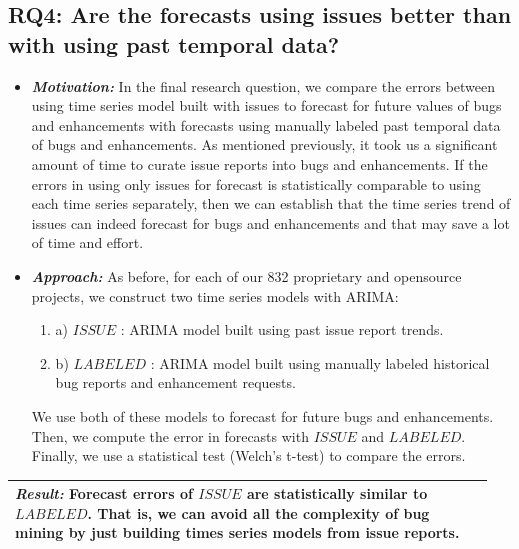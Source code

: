 \documentclass[sigconf, preprint]{acmart}
\newcommand{\be}{\begin{enumerate}}
\newcommand{\ee}{\end{enumerate}}
\begin{document}
\subsection*{RQ4: Are the forecasts using issues better than with using past temporal data?}
\begin{itemize}[leftmargin=-1pt]

\item[] \textit{\textbf{Motivation:}} In the final research question, we 
compare the 
errors between using time series model built with issues to 
forecast for future values of bugs and enhancements with forecasts 
using manually labeled past temporal data of bugs and enhancements. As 
mentioned previously, it took us a significant amount of time to curate issue 
reports into bugs and enhancements. If the errors in using only issues for 
forecast is statistically comparable to using each time series separately, then 
we can establish that the time series trend of issues can indeed forecast for 
bugs and enhancements and that may save a lot of time and effort.

\item[] \textit{\textbf{Approach:}} As before, for each of our 832 proprietary 
and 
opensource 
projects, we construct two time series models with ARIMA:
\be
\item[] a) $\mathit{ISSUE}$ : ARIMA model built using past issue report trends.
\item[] b) $\mathit{LABELED}$ : ARIMA model built using manually labeled 
historical bug reports and enhancement requests.
\ee

We use both of these models to forecast for future bugs and enhancements. 
Then, we compute the error in forecasts with   $\mathit{ISSUE}$ and 
$\mathit{LABELED}$. Finally, we use a statistical test (Welch's t-test) to 
compare the errors.
 
\end{itemize}

\vspace{1mm}
\noindent\begin{minipage}{\linewidth}
	\begin{center}
		\begin{tabular}{p{0.95\linewidth}}
			\arrayrulecolor{Gray}
			\hline
			 
			\rowcolor{Gray}   \textit{\textbf{Result:}} Forecast errors of 
$\mathit{ISSUE}$ are statistically similar to $\mathit{LABELED}$. That is, we 
can avoid all the complexity of bug mining by just building times series models 
from issue reports. \\\hline
		\end{tabular}
	\end{center}
\end{minipage}\bigstrut[t]
\end{document}
